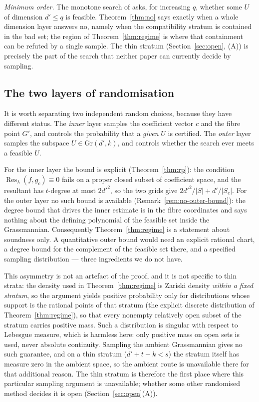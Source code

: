 \documentclass[journal]{IEEEtran}
\theoremstyle{plainn}
\theoremstyle{remark}
\begin{document}
\emph{Minimum order.} The monotone search of \cite{paperII} asks, for increasing $q$, whether some
$U$ of dimension $d'\le q$ is feasible. Theorem~\ref{thm:no} says exactly when a whole dimension
layer answers no, namely when the compatibility stratum is contained in the bad set; the region of
Theorem~\ref{thm:regime} is where that containment can be refuted by a single sample. The thin
stratum (Section~\ref{sec:open}, (A)) is precisely the part of the search that neither paper can
currently decide by sampling.

\subsection{The two layers of randomisation}\label{sec:two-layers}

It is worth separating two independent random choices, because they have different status. The
\emph{inner} layer samples the coefficient vector $c$ and the fibre point $G'$, and controls the
probability that a \emph{given} $U$ is certified. The \emph{outer} layer samples the subspace
$U\in\mathrm{Gr}(d',k)$, and controls whether the search ever meets a feasible $U$.

For the inner layer the bound is explicit (Theorem~\ref{thm:rp}): the condition
$\operatorname{Res}_\lambda(f,g_c)\equiv0$ fails on a proper closed subset of coefficient space, and
the resultant has $t$-degree at most $2d'^{2}$, so the two grids give
$2d'^{2}/|S|+d'/|S_c|$. For the outer layer no such bound is available
(Remark~\ref{rem:no-outer-bound}): the degree bound that drives the inner estimate is in the fibre
coordinates and says nothing about the defining polynomial of the feasible set inside the
Grassmannian. Consequently Theorem~\ref{thm:regime} is a statement about soundness only. A quantitative
outer bound would need an explicit rational chart, a degree bound for the complement of the feasible
set there, and a specified sampling distribution --- three ingredients we do not have.

This asymmetry is not an artefact of the proof, and it is not specific to thin strata: the density used in
Theorem~\ref{thm:regime} is Zariski density \emph{within a fixed stratum}, so the argument yields positive
probability only for distributions whose support is the rational points of that stratum (the explicit
discrete distribution of Theorem~\ref{thm:regime}), so that every nonempty relatively open subset of the
stratum carries positive mass. Such a distribution is singular with respect to Lebesgue measure, which is
harmless here: only positive mass on open sets is used, never absolute continuity. Sampling the
ambient Grassmannian gives no such guarantee, and on a thin stratum ($d'+t-k<s$) the stratum itself has
measure zero in the ambient space, so the ambient route is unavailable there for that additional reason. The thin stratum is therefore the first place where this particular sampling argument is
unavailable; whether some other randomised method decides it is open (Section~\ref{sec:open}(A)).
\end{document}
